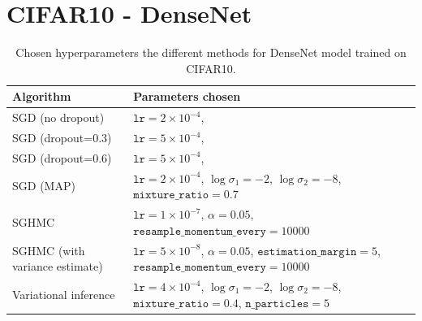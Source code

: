 \FloatBarrier
\section{CIFAR10 - DenseNet} \label{apx:densenet-params}

\begin{table}[H]
    \centering
    \begin{tabular}{p{4cm}p{9cm}}
        \toprule
        Algorithm & Parameters chosen \\ \midrule
        SGD (no dropout) & $\texttt{lr}=2\times 10^{-4}$, \\ \midrule
        SGD (dropout=0.3) & $\texttt{lr}=5\times 10^{-4}$, \\ \midrule
        SGD (dropout=0.6) & $\texttt{lr}=5\times 10^{-4}$,  \\ \midrule
        SGD (MAP) & 
        $\texttt{lr}=2 \times 10^{-4}$, 
        $\log\sigma_1=-2$, 
        $\log\sigma_2=-8$, 
        $\texttt{mixture\_ratio}=0.7$ \\ \midrule
        SGHMC & $\texttt{lr}=1\times 10^{-7}$, $\alpha=0.05$, $\texttt{resample\_momentum\_every}=10000$ \\ \midrule
        SGHMC (with variance estimate) &  $\texttt{lr}= 5\times 10^{-8}$, 
        $\alpha=0.05$,
        $\texttt{estimation\_margin}=5$, $\texttt{resample\_momentum\_every}=10000$ \\ \midrule
        Variational inference &    
        $\texttt{lr}=4 \times 10^{-4}$,
        $\log\sigma_1=-2$,
        $\log\sigma_2=-8$,
        $\texttt{mixture\_ratio}=0.4$,
        $\texttt{n\_particles}=5$ \\
        \bottomrule
    \end{tabular}
    \caption{Chosen hyperparameters the different methods for DenseNet model trained on CIFAR10.}
    \label{tab:densenet-hparams}
\end{table}
